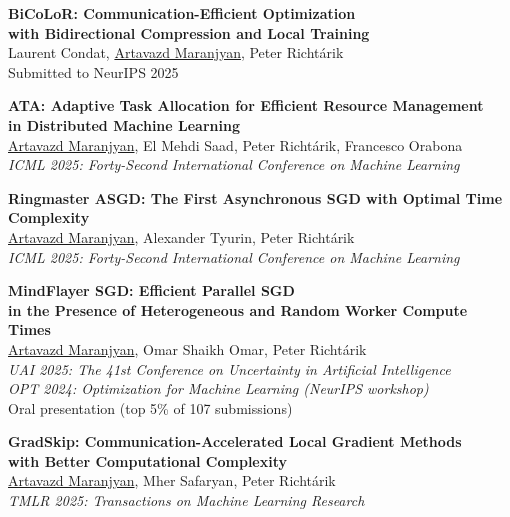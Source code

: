 \documentclass[11pt,a4paper,sans]{moderncv}        %
\newcommand{\red}{\color{cherry}}
\newcommand{\highlight}[1]{{\red #1}}
\begin{document}
\begin{etaremune}

\item \textbf{BiCoLoR: Communication-Efficient Optimization \\ with Bidirectional Compression and Local Training}\\
Laurent Condat, \underline{Artavazd Maranjyan}, Peter Richtárik\\
Submitted to NeurIPS 2025

\item \textbf{ATA: Adaptive Task Allocation for Efficient Resource Management \\ in Distributed Machine Learning}\\
\underline{Artavazd Maranjyan}, El Mehdi Saad, Peter Richtárik, Francesco Orabona\\
\textit{ICML 2025: Forty-Second International Conference on Machine Learning}

\item \textbf{Ringmaster ASGD: The First Asynchronous SGD with Optimal Time Complexity}\\
\underline{Artavazd Maranjyan}, Alexander Tyurin, Peter Richtárik\\
\textit{ICML 2025: Forty-Second International Conference on Machine Learning}

\item \textbf{MindFlayer SGD: Efficient Parallel SGD \\ in the Presence of Heterogeneous and Random Worker Compute Times}\\
\underline{Artavazd Maranjyan}, Omar Shaikh Omar, Peter Richtárik\\
\textit{UAI 2025: The 41st Conference on Uncertainty in Artificial Intelligence}\\
\textit{OPT 2024: Optimization for Machine Learning (NeurIPS workshop)}\\
\highlight{Oral presentation (top 5\% of 107 submissions)}

\item \textbf{GradSkip: Communication-Accelerated Local Gradient Methods \\ with Better Computational Complexity}\\
\underline{Artavazd Maranjyan}, Mher Safaryan, Peter Richtárik\\
\textit{TMLR 2025: Transactions on Machine Learning Research}


\end{etaremune}
\end{document}
